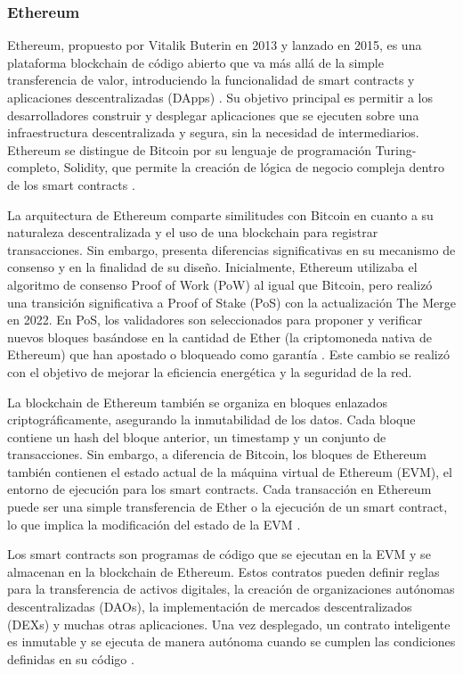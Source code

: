 \subsubsection{Ethereum}
Ethereum, propuesto por Vitalik Buterin en 2013 y lanzado en 2015, es una plataforma blockchain de código abierto que va más allá de la simple transferencia de valor, introduciendo la funcionalidad de smart contracts y aplicaciones descentralizadas (DApps) \cite{EthereumWhitePaper}. Su objetivo principal es permitir a los desarrolladores construir y desplegar aplicaciones que se ejecuten sobre una infraestructura descentralizada y segura, sin la necesidad de intermediarios. Ethereum se distingue de Bitcoin por su lenguaje de programación Turing-completo, Solidity, que permite la creación de lógica de negocio compleja dentro de los smart contracts \cite{Wood2014}.

La arquitectura de Ethereum comparte similitudes con Bitcoin en cuanto a su naturaleza descentralizada y el uso de una blockchain para registrar transacciones. Sin embargo, presenta diferencias significativas en su mecanismo de consenso y en la finalidad de su diseño. Inicialmente, Ethereum utilizaba el algoritmo de consenso Proof of Work (PoW) al igual que Bitcoin, pero realizó una transición significativa a Proof of Stake (PoS) con la actualización The Merge en 2022. En PoS, los validadores son seleccionados para proponer y verificar nuevos bloques basándose en la cantidad de Ether (la criptomoneda nativa de Ethereum) que han apostado o bloqueado como garantía \cite{Buterin2014}. Este cambio se realizó con el objetivo de mejorar la eficiencia energética y la seguridad de la red.

La blockchain de Ethereum también se organiza en bloques enlazados criptográficamente, asegurando la inmutabilidad de los datos. Cada bloque contiene un hash del bloque anterior, un timestamp y un conjunto de transacciones. Sin embargo, a diferencia de Bitcoin, los bloques de Ethereum también contienen el estado actual de la máquina virtual de Ethereum (EVM), el entorno de ejecución para los smart contracts. Cada transacción en Ethereum puede ser una simple transferencia de Ether o la ejecución de un smart contract, lo que implica la modificación del estado de la EVM \cite{EthereumYellowPaper}.

Los smart contracts son programas de código que se ejecutan en la EVM y se almacenan en la blockchain de Ethereum. Estos contratos pueden definir reglas para la transferencia de activos digitales, la creación de organizaciones autónomas descentralizadas (DAOs), la implementación de mercados descentralizados (DEXs) y muchas otras aplicaciones. Una vez desplegado, un contrato inteligente es inmutable y se ejecuta de manera autónoma cuando se cumplen las condiciones definidas en su código \cite{Szabo1997}.

